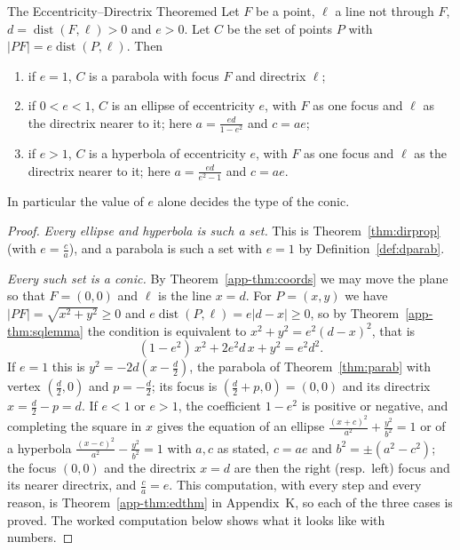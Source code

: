 \documentclass[11pt]{article}
\begin{document}
\begin{thm}{The Eccentricity--Directrix Theorem}{ed}
Let $F$ be a point, $\ell$ a line not through $F$, $d=\operatorname{dist}(F,\ell)>0$ and $e>0$. Let $C$ be the set of points $P$ with $\lvert PF\rvert=e\operatorname{dist}(P,\ell)$. Then
\begin{enumerate}[label=(\arabic*)]
  \item if $e=1$, $C$ is a parabola with focus $F$ and directrix $\ell$;
  \item if $0<e<1$, $C$ is an ellipse of eccentricity $e$, with $F$ as one focus and $\ell$ as the directrix nearer to it; here $a=\frac{ed}{1-e^2}$ and $c=ae$;
  \item if $e>1$, $C$ is a hyperbola of eccentricity $e$, with $F$ as one focus and $\ell$ as the directrix nearer to it; here $a=\frac{ed}{e^2-1}$ and $c=ae$.
\end{enumerate}
In particular the value of $e$ alone decides the type of the conic.
\end{thm}
\begin{proof}
\emph{Every ellipse and hyperbola is such a set.} This is Theorem~\ref{thm:dirprop} (with $e=\frac ca$), and a parabola is such a set with $e=1$ by Definition~\ref{def:dparab}.

\emph{Every such set is a conic.} By Theorem~\ref{app-thm:coords} we may move the plane so that $F=(0,0)$ and $\ell$ is the line $x=d$. For $P=(x,y)$ we have $\lvert PF\rvert=\sqrt{x^2+y^2}\ge0$ and $e\operatorname{dist}(P,\ell)=e\lvert d-x\rvert\ge0$, so by Theorem~\ref{app-thm:sqlemma} the condition is equivalent to $x^2+y^2=e^2(d-x)^2$, that is
\[
(1-e^2)\,x^2+2e^2d\,x+y^2=e^2d^2 .
\]
If $e=1$ this is $y^2=-2d\left(x-\frac d2\right)$, the parabola of Theorem~\ref{thm:parab} with vertex $\left(\frac d2,0\right)$ and $p=-\frac d2$; its focus is $\left(\frac d2+p,0\right)=(0,0)$ and its directrix $x=\frac d2-p=d$. If $e<1$ or $e>1$, the coefficient $1-e^2$ is positive or negative, and completing the square in $x$ gives the equation of an ellipse $\frac{(x+c)^2}{a^2}+\frac{y^2}{b^2}=1$ or of a hyperbola $\frac{(x-c)^2}{a^2}-\frac{y^2}{b^2}=1$ with $a,c$ as stated, $c=ae$ and $b^2=\pm(a^2-c^2)$; the focus $(0,0)$ and the directrix $x=d$ are then the right (resp.\ left) focus and its nearer directrix, and $\frac ca=e$. This computation, with every step and every reason, is Theorem~\ref{app-thm:edthm} in Appendix~K, so each of the three cases is proved. The worked computation below shows what it looks like with numbers.
\end{proof}
\end{document}
